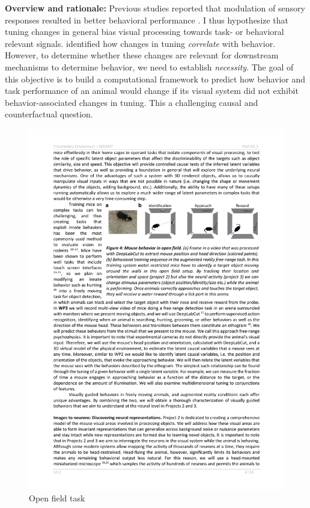 \documentclass[B2,COG]{ercgrant}
\begin{document}
\textbf{Overview and rationale:} 
Previous studies reported that modulation of sensory responses resulted in better behavioral performance \parencite{Spitzer1988-kq, Bennett2013-rk, Dadarlat2017-jw, De_Gee2022-ir}.
I thus hypothesize that tuning changes in general bias visual processing towards task- or behavioral relevant signals.
 identified how changes in tuning \textit{correlate} with behavior.
However, to determine whether these changes are relevant for downstream mechanisms to determine behavior, we need to establish \textit{necessity}. 
The goal of this objective is to build a computational framework to predict how behavior and task performance of an animal would change if its visual system did not exhibit behavior-associated changes in tuning. 
This a challenging causal and counterfactual question.
\begin{figure}
\includegraphics[width=\linewidth,trim=0 15 0 5, clip]{figures/openfield_ar.pdf}
\caption{Open field task}
\label{fig:openfield}
\end{figure}
\end{document}
